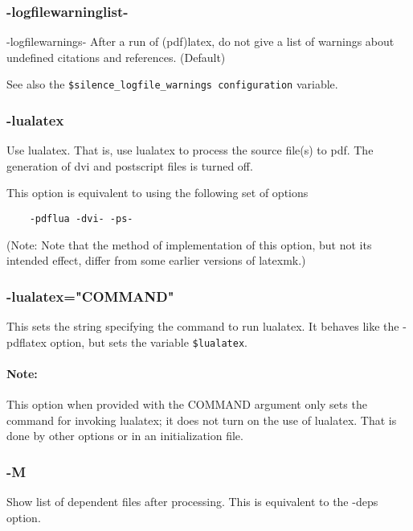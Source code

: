 \subsubsection{-logfilewarninglist-}

-logfilewarnings-  After a run of (pdf)latex, do not give a list
of warnings about undefined citations and references.  (Default)

See also the \verb|$silence_logfile_warnings configuration| variable.


\subsubsection{-lualatex}

Use lualatex.  That is,  use  lualatex  to  process  the  source
file(s)  to  pdf.  The generation of dvi and postscript files is
turned off.

This option is equivalent to using the following set of options

\begin{verbatim}
	-pdflua -dvi- -ps-
\end{verbatim}

(Note: Note that the method of implementation  of  this  option,
but  not  its intended effect, differ from some earlier versions
of latexmk.)


\subsubsection{-lualatex="COMMAND"}

This sets the string specifying the command to run lualatex.  It
behaves like the -pdflatex option, but sets the variable
\verb|$lualatex|.

\paragraph{Note:}

This option when provided with the COMMAND  argument  only sets  the command
for invoking lualatex; it does not turn on the use of lualatex. That is done by
other options or in an initialization file.

\subsubsection{-M}

Show  list of dependent files after processing.  This is equivalent to
the -deps option.


